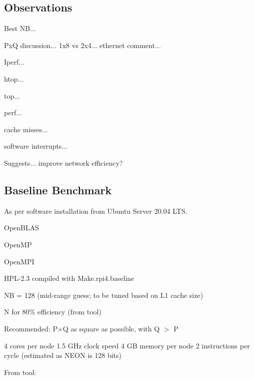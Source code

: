 \documentclass{article}
\begin{document}
\subsection{Observations}

Best NB...

PxQ discussion... 1x8 vs 2x4... ethernet comment...

Iperf...

htop...

top...

perf...

cache misses...

software interrupts...

Suggests... improve network efficiency?



%
%



\subsection{Baseline Benchmark}
As per software installation from Ubuntu Server 20.04 LTS.

OpenBLAS

OpenMP

OpenMPI

HPL-2.3 compiled with Make.rpi4.baseline

NB = 128 (mid-range guess; to be tuned based on L1 cache size)

N for 80\% efficiency (from tool)

Recommended: P$\times$Q as square as possible, with Q $>$ P

4 cores per node
1.5 GHz clock speed
4 GB memory per node
2 instructions per cycle (estimated as NEON is 128 bits)

From tool:

\end{document}

